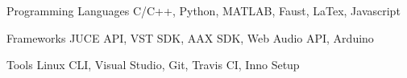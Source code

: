 

\begin{cvskills}

    \cvskill
    {Programming Languages} %
    {C/C++, Python, MATLAB, Faust, LaTex, Javascript} %


    \cvskill
    {Frameworks} %
    {JUCE API, VST SDK, AAX SDK, Web Audio API, Arduino} %

    \cvskill
    {Tools} %
    {Linux CLI, Visual Studio, Git, Travis CI, Inno Setup} %

\end{cvskills}
